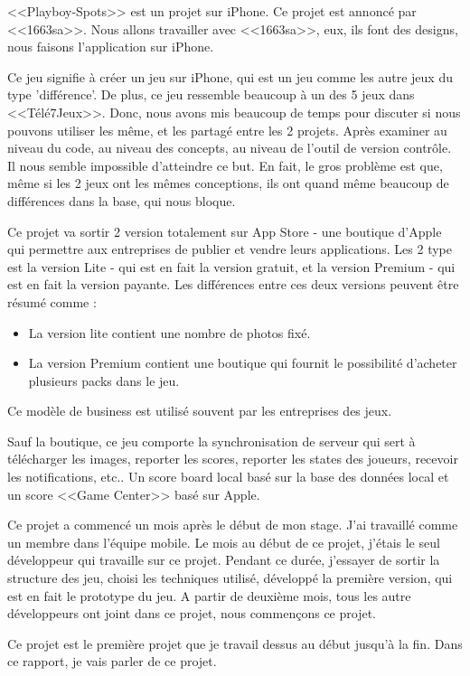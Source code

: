 <<Playboy-Spots>> est un projet sur iPhone. Ce projet est annoncé par <<1663sa>>. Nous allons travailler avec <<1663sa>>, eux, ils font des designs, nous faisons l'application sur iPhone. 

Ce jeu signifie à créer un jeu sur iPhone, qui est un jeu comme les autre jeux du type 'différence'. De plus, ce jeu ressemble beaucoup à un des 5 jeux dans <<Télé7Jeux>>. Donc, nous avons mis beaucoup de temps pour discuter si nous pouvons utiliser les même, et les partagé entre les 2 projets. Après examiner au niveau du code, au niveau des concepts, au niveau de l’outil de version contrôle. Il nous semble impossible d'atteindre ce but. En fait, le gros problème est que, même si les 2 jeux ont les mêmes conceptions, ils ont quand même beaucoup de différences dans la base, qui nous bloque.

Ce projet va sortir 2 version totalement sur App Store - une boutique d’Apple qui permettre aux entreprises de publier et vendre leurs applications. Les 2 type est la version Lite - qui est en fait la version gratuit, et la version Premium - qui est en fait la version payante. Les différences entre ces deux versions peuvent être résumé comme : 
\begin{itemize}
	\item La version lite contient une nombre de photos fixé. 
	\item La version Premium contient une boutique qui fournit le possibilité d'acheter plusieurs packs dans le jeu. 
\end{itemize}
Ce modèle de business est utilisé souvent par les entreprises des jeux. 

Sauf la boutique, ce jeu comporte la synchronisation de serveur qui sert à télécharger les images, reporter les scores, reporter les states des joueurs, recevoir les notifications, etc.. Un score board local basé sur la base des données local et un score <<Game Center>> basé sur Apple.

Ce projet a commencé un mois après le début de mon stage. J'ai travaillé comme un membre dans l'équipe mobile. Le mois au début de ce projet, j’étais le seul développeur qui travaille sur ce projet. Pendant ce durée, j'essayer de sortir la structure des jeu, choisi les techniques utilisé, développé la première version, qui est en fait le prototype du jeu. A partir de deuxième mois, tous les autre développeurs ont joint dans ce projet, nous commençons ce projet.

Ce projet est le première projet que je travail dessus au début jusqu'à la fin. Dans ce rapport, je vais parler de ce projet.




